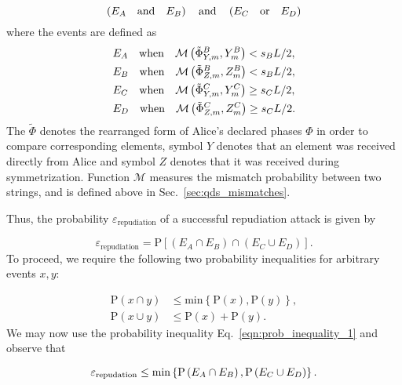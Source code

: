 \begin{equation}
\left(E_A \qq{and} E_B \right) \qq{and} \left( E_C \qq{or} E_D\right) \notag
\end{equation}
where the events are defined as
\begin{align}\label{eqn:repudiation_events}
&E_A \qq{when} \mathcal{M}\left(\tilde{\Phi}_{Y, m}^B, Y_m^B\right) < s_B L/2,  \notag \\
%
&E_B \qq{when} \mathcal{M}\left(\tilde{\Phi}_{Z, m}^B, Z_m ^B\right) < s_B L/2, \notag \\
%
&E_C \qq{when} \mathcal{M}\left(\tilde{\Phi}_{Y, m}^C, Y_m^C\right) \ge s_C L/2, \notag \\
%
&E_D \qq{when} \mathcal{M}\left(\tilde{\Phi}_{Z, m}^C, Z_m^C\right) \ge s_C L/2 .
\end{align}
The $\tilde{\Phi}$ denotes the rearranged form of Alice's declared phases $\Phi$ in order to compare corresponding elements, symbol $Y$ denotes that an element was received directly from Alice and symbol $Z$ denotes that it was received during symmetrization. Function $\mathcal{M}$ measures the mismatch probability between two strings, and is defined above in Sec.~\ref{sec:qds_mismatches}.

Thus, the probability $\varepsilon_{\text{repudiation}}$ of a successful repudiation attack is given by

\begin{equation}
\varepsilon_{\text{repudiation}} = \text{P}\left[\left(E_A \cap E_B\right) \cap \left(E_C \cup E_D\right)\right].
\end{equation}
To proceed, we require the following two probability inequalities for arbitrary events $x, y$:

\begin{align}
\label{eqn:prob_inequality_1}
\text{P}\left(x \cap y\right) &\le \text{min}\left\{\text{P}\left(x\right), \text{P}\left(y\right)\right\}, \\
\label{eqn:prob_inequality_2}
\text{P}\left(x \cup y\right) &\le \text{P}\left(x\right) + \text{P}\left(y\right).
\end{align}
\noindent We may now use the probability inequality Eq.~\ref{eqn:prob_inequality_1} and observe that 

\begin{equation}
\varepsilon_{\text{repudation}} \le \text{min}\left\{\text{P}\left(E_A \cap E_B\right), \text{P}\left(E_C \cup E_D\right)\right\}. \notag
\end{equation}

